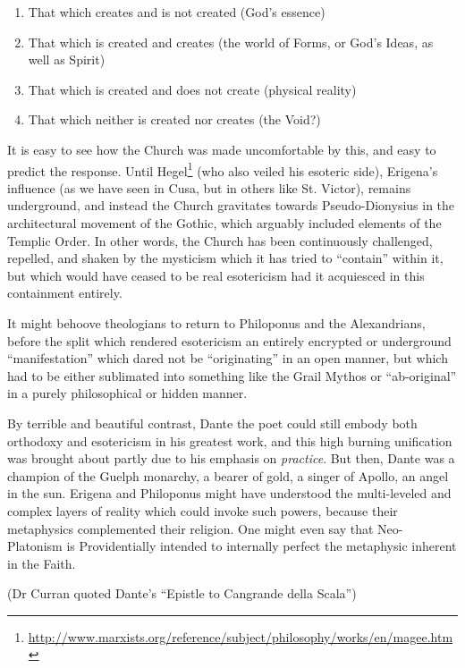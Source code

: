 \begin{enumerate}
\item That which creates and is not created (God's essence)

\itshape

\item That which is created and creates (the world of Forms, or God's Ideas, as well as Spirit)

\item That which is created and does not create (physical reality)

\item That which neither is created nor creates (the Void?)

\end{enumerate}

It is easy to see how the Church was made uncomfortable by this, and easy to predict the response. Until Hegel\footnote{\url{http://www.marxists.org/reference/subject/philosophy/works/en/magee.htm}} (who also veiled his esoteric side), Erigena's influence (as we have seen in Cusa, but in others like St. Victor), remains underground, and instead the Church gravitates towards Pseudo-Dionysius in the architectural movement of the Gothic, which arguably included elements of the Templic Order. In other words, the Church has been continuously challenged, repelled, and shaken by the mysticism which it has tried to ``contain'' within it, but which would have ceased to be real esotericism had it acquiesced in this containment entirely.

It might behoove theologians to return to Philoponus and the Alexandrians, before the split which rendered esotericism an entirely encrypted or underground ``manifestation'' which dared not be ``originating'' in an open manner, but which had to be either sublimated into something like the Grail Mythos or ``ab-original'' in a purely philosophical or hidden manner.

By terrible and beautiful contrast, Dante the poet could still embody both orthodoxy and esotericism in his greatest work, and this high burning unification was brought about partly due to his emphasis on \emph{practice}. But then, Dante was a champion of the Guelph monarchy, a bearer of gold, a singer of Apollo, an angel in the sun. Erigena and Philoponus might have understood the multi-leveled and complex layers of reality which could invoke such powers, because their metaphysics complemented their religion. One might even say that Neo-Platonism is Providentially intended to internally perfect the metaphysic inherent in the Faith.

(Dr Curran quoted Dante's ``Epistle to Cangrande della Scala'')



